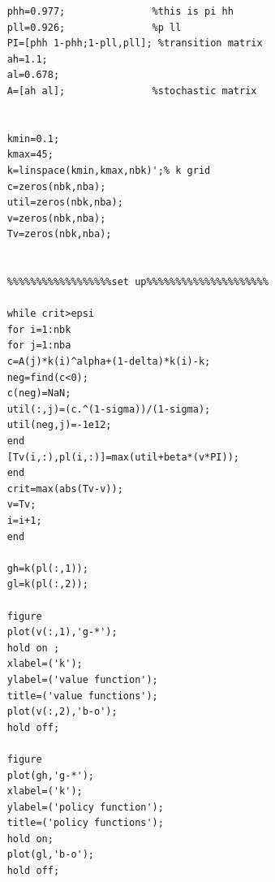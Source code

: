 \documentclass[12pt]{article}
\begin{document}
\begin{enumerate}
\begin{verbatim}
	phh=0.977;               %this is pi hh
	pll=0.926;               %p ll
	PI=[phh 1-phh;1-pll,pll]; %transition matrix
	ah=1.1;
	al=0.678;
	A=[ah al];               %stochastic matrix
	
	
	kmin=0.1;
	kmax=45;
	k=linspace(kmin,kmax,nbk)';% k grid
	c=zeros(nbk,nba);
	util=zeros(nbk,nba);
	v=zeros(nbk,nba);
	Tv=zeros(nbk,nba);
	
	
	%%%%%%%%%%%%%%%%%%set up%%%%%%%%%%%%%%%%%%%%%
	
	while crit>epsi
	for i=1:nbk
	for j=1:nba
	c=A(j)*k(i)^alpha+(1-delta)*k(i)-k;
	neg=find(c<0);
	c(neg)=NaN;
	util(:,j)=(c.^(1-sigma))/(1-sigma);
	util(neg,j)=-1e12;
	end
	[Tv(i,:),pl(i,:)]=max(util+beta*(v*PI));
	end
	crit=max(abs(Tv-v));
	v=Tv;
	i=i+1;
	end
	
	gh=k(pl(:,1));
	gl=k(pl(:,2));
	
	figure
	plot(v(:,1),'g-*');
	hold on ;
	xlabel=('k');
	ylabel=('value function');
	title=('value functions');
	plot(v(:,2),'b-o');
	hold off;
	
	figure
	plot(gh,'g-*');
	xlabel=('k');
	ylabel=('policy function');
	title=('policy functions');
	hold on;
	plot(gl,'b-o');
	hold off;
	
	
	
	\end{verbatim}
	\end{enumerate}


	

	
	
	
	
	
	
	
	
	
	
	
	
	
	
	
\end{document}
